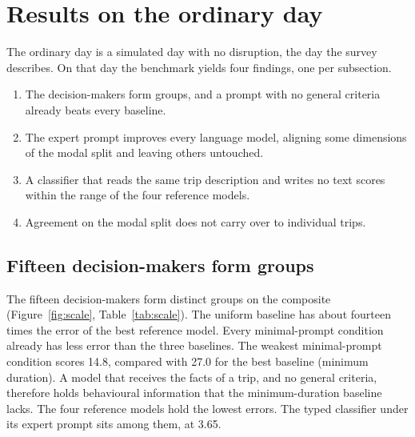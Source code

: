 \section{Results on the ordinary day}
\label{sec:results}

The ordinary day is a simulated day with no disruption, the day the survey describes. 
On that day the benchmark yields four findings, one per subsection.

\begin{enumerate}
  \item The decision-makers form groups, and a prompt with no general criteria
    already beats every baseline.
  \item The expert prompt improves every language model, aligning some dimensions of the
    modal split and leaving others untouched.
  \item A classifier that reads the same trip description and writes no text scores within
    the range of the four reference models.
  \item Agreement on the modal split does not carry over to individual trips.
\end{enumerate}

\subsection{Fifteen decision-makers form groups}
\label{sec:scale}

The fifteen decision-makers form distinct groups on the composite (Figure~\ref{fig:scale},
Table~\ref{tab:scale}). The uniform baseline has about fourteen times the error of the best
reference model. Every minimal-prompt condition already has less error than the three
baselines. The weakest minimal-prompt condition scores 14.8, compared with 27.0 for the best
baseline (minimum duration). A model that receives the facts of a trip, and no general
criteria, therefore holds behavioural information that the minimum-duration baseline lacks.
The four reference models hold the lowest errors. The typed classifier under its expert
prompt sits among them, at 3.65.

